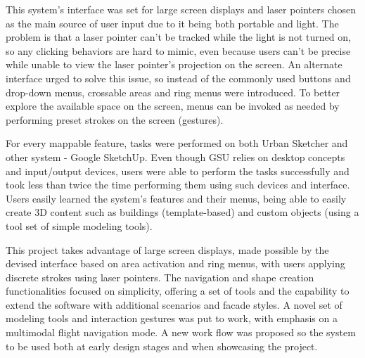 

This system's interface was set for large screen displays and laser pointers chosen as the main source of user input
due to it being both portable and light.
The problem is that a laser pointer can't be tracked while the light is not turned on,
so any clicking behaviors are hard to mimic, even because users can't be 
precise while unable to view the laser pointer's projection on the screen.
An alternate interface urged to solve this issue, so instead of the commonly used buttons and drop-down menus,
crossable areas and ring menus were introduced.
To better explore the available space on the screen,
menus can be invoked as needed by performing preset strokes on the screen (gestures).


For every mappable feature, tasks were performed on both Urban Sketcher and other system - Google SketchUp.
Even though GSU relies on desktop concepts and input/output devices, users were able to perform the tasks
successfully and took less than twice the time performing them using such devices and interface.
Users easily learned the system's features and their menus, being able to easily
create 3D content such as buildings (template-based) and custom objects (using a tool set of simple modeling tools).



This project takes advantage of large screen displays,
made possible by the devised interface based on area activation and ring menus,
with users applying discrete strokes using laser pointers.
The navigation and shape creation functionalities focused on simplicity,
offering a set of tools and the capability to extend the software with additional scenarios and facade styles.
A novel set of modeling tools and interaction gestures was put to work, with emphasis on a multimodal flight navigation mode.
A new work flow was proposed so the system to be used both at early design stages and
when showcasing the project.



